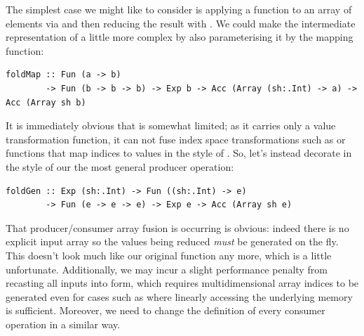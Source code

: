 The simplest case we might like to consider is applying a function to an array
of elements via  and then reducing the result with . We
could make the intermediate representation of  a little more
complex by also parameterising it by the mapping function:
%
\begin{lstlisting}[style=haskell,numbers=none]
foldMap :: Fun (a -> b)
        -> Fun (b -> b -> b) -> Exp b -> Acc (Array (sh:.Int) -> a) -> Acc (Array sh b)
\end{lstlisting}

It is immediately obvious that  is somewhat limited; as it
carries only a value transformation function, it can not fuse index space
transformations such as  or functions that map indices to
values in the style of . So, let's instead decorate
 in the style of our the most general producer operation:
%
\begin{lstlisting}[style=haskell,numbers=none]
foldGen :: Exp (sh:.Int) -> Fun ((sh:.Int) -> e)
        -> Fun (e -> e -> e) -> Exp e -> Acc (Array sh e)
\end{lstlisting}
%
That producer/consumer array fusion is occurring is obvious: indeed there is no
explicit input array so the values being reduced \emph{must} be generated on the
fly. This doesn't look much like our original  function any more,
which is a little unfortunate. Additionally, we may incur a slight performance
penalty from recasting all inputs into  form, which requires
multidimensional array indices to be generated even for cases such as
 where linearly accessing the underlying memory is
sufficient. Moreover, we need to change the definition of every consumer
operation in a similar way.

